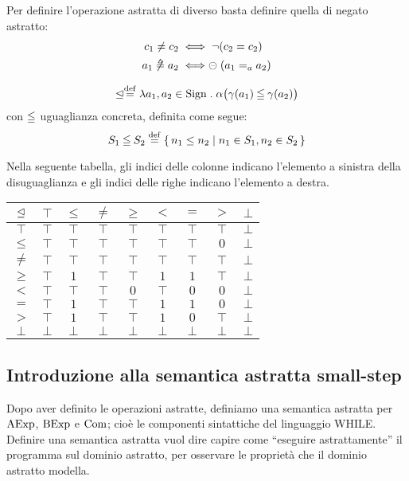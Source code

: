 \begin{definizione}
Per definire l'operazione astratta di diverso basta definire quella di negato astratto:
\begin{align*}
	c_1 \neq c_2 &\iff \neg (c_2 = c_2) \\
	a_1 \mathrel{\not\triangleq} a_2 &\iff \mathrel{\circleddash} (a_1 =_a a_2)
\end{align*}
\end{definizione}

\begin{definizione}
\[
	\absleq \defeq \lambda a_1,a_2 \in \Sign \st \alpha\bigl(\gamma(a_1) \conineq \gamma(a_2)\bigr)
\]
con $\mathbin{\leqq}$ uguaglianza concreta, definita come segue:
\[
	S_1 \conineq S_2 \defeq \{\, n_1 \leq n_2 \mid n_1 \in S_1, n_2 \in S_2 \,\}
\]
\end{definizione}
Nella seguente tabella, gli indici delle colonne indicano
l'elemento a sinistra della disuguaglianza e gli indici delle righe
indicano l'elemento a destra.

\begin{center}
	\begin{tabular}{ c | c c c c c c c c }
		$\mathrel{\trianglelefteq}$ & $\top$ & $\leq$ & $\neq$ & $\geq$ & $<$ & $=$ & $>$ & $\bot$ \\
		\hline
		$\top$ & $\top$ & $\top$ & $\top$ & $\top$ & $\top$ & $\top$ & $\top$ & $\bot$ \\
		$\leq$ & $\top$ & $\top$ & $\top$ & $\top$ & $\top$ & $\top$ & $0$ & $\bot$ \\
		$\neq$ & $\top$ & $\top$ & $\top$ & $\top$ & $\top$ & $\top$ & $\top$ & $\bot$\\
		$\geq$ & $\top$ & $1$ & $\top$ & $\top$ & $1$ & $1$ & $\top$ & $\bot$ \\
		$<$ & $\top$ & $\top$ & $\top$ & $0$ & $\top$ & $0$ & $0$ & $\bot$\\
		$=$ & $\top$ & $1$ & $\top$ & $\top$ & $1$ & $1$ & $0$ & $\bot$ \\
		$>$ & $\top$ & $1$ & $\top$ & $\top$ & $1$ & $0$ & $\top$ & $\bot$ \\
		$\bot$ & $\bot$ & $\bot$ & $\bot$ & $\bot$ & $\bot$ & $\bot$ & $\bot$ & $\bot$
	\end{tabular}
\end{center}

\subsection{Introduzione alla semantica astratta small-step}
Dopo aver definito le operazioni astratte,
definiamo una semantica astratta per $\mathrm{AExp}$, $\mathrm{BExp}$ e $\mathrm{Com}$; cioè
le componenti sintattiche del linguaggio WHILE.
Definire una semantica astratta vuol dire capire come
``eseguire astrattamente'' il programma sul dominio astratto,
per osservare le proprietà che il dominio astratto modella.

